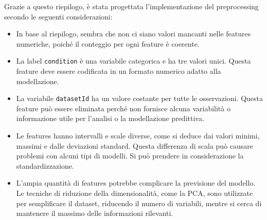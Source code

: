 \bigskip

Grazie a questo riepilogo, è stata progettata l'implementazione del preprocessing secondo le seguenti considerazioni:

\begin{itemize}
    \item In base al riepilogo, sembra che non ci siano valori mancanti nelle features numeriche, poiché il conteggio per ogni feature è coerente.
    \item La label \texttt{condition} è una variabile categorica e ha tre valori unici. Questa feature deve essere codificata in un formato numerico adatto alla modellazione.
    \item La variabile \texttt{datasetId} ha un valore costante per tutte le osservazioni. Questa feature può essere eliminata perché non fornisce alcuna variabilità o informazione utile per l'analisi o la modellazione predittiva.
    \item Le features hanno intervalli e scale diverse, come si deduce dai valori minimi, massimi e dalle deviazioni standard. Questa differenza di scala può causare problemi con alcuni tipi di modelli. Si può prendere in considerazione la standardizzazione.
    \item L'ampia quantità di features potrebbe complicare la previsione del modello. Le tecniche di riduzione della dimensionalità, come la PCA, sono utilizzate per semplificare il dataset, riducendo il numero di variabili, mentre si cerca di mantenere il massimo delle informazioni rilevanti.
\end{itemize}

\bigskip

